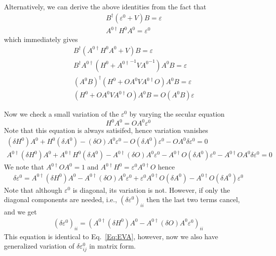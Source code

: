 \documentclass[aps,prb,floatfix,epsfig,singlecolumn,showpacs,preprintnumbers]{revtex4}
\newcommand{\vk}{{\mathbf{k}}}
\newcommand{\vK}{{\mathbf{K}}}
\begin{document}
Alternatively, we can derive the above identities from the fact that
\begin{eqnarray}
&& B^\dagger (\varepsilon^0 + V)B = \varepsilon \\
&& A^{0\dagger} H^0 A^0 =\varepsilon^0
\end{eqnarray}
which immediately gives
\begin{eqnarray}
&& B^\dagger (A^{0\dagger} H^0 A^0 +V)B=\varepsilon\\
&& B^\dagger A^{0\dagger}(H^0+{A^{0\dagger}}^{-1}V {A^0}^{-1})A^0B=\varepsilon\\
&& (A^{0}B)^{\dagger}(H^0+O A^0 V A^{0\dagger}O)A^0B=\varepsilon \\
&& (H^0+O A^0 V A^{0\dagger}O)A^0B=O(A^0 B)\varepsilon 
\end{eqnarray}
% 


Now we check a small variation of the $\varepsilon^0$ by varying the
secular equation 
$$H^0 A^0=O A^0\varepsilon^0$$
Note that this equation is always satisifed,
hence variation vanishes
\begin{eqnarray}
(\delta H^0) A^0 + H^0 (\delta A^0) - (\delta O) A^0 \varepsilon^0 - O  (\delta A^0)\varepsilon^0 - O A^0 \delta\varepsilon^0=0\\
A^{0\dagger}(\delta H^0) A^0 + A^{0\dagger} H^0 (\delta A^0) - A^{0\dagger} (\delta O) A^0 \varepsilon^0 - A^{0\dagger} O  (\delta A^0)\varepsilon^0 - A^{0\dagger} O A^0 \delta\varepsilon^0=0
\end{eqnarray}
We note that $A^{0\dagger} O A^0=1$ and $A^{0\dagger} H^0=\varepsilon^0A^{0\dagger}O$ hence
\begin{eqnarray}
\delta\varepsilon^0=A^{0\dagger}(\delta H^0) A^0 - A^{0\dagger} (\delta O) A^0 \varepsilon^0 +  \varepsilon^0A^{0\dagger}O (\delta A^0) - A^{0\dagger} O  (\delta A^0)\varepsilon^0 
\label{Eq:227}
\end{eqnarray}
Note that although $\varepsilon^0$ is diagonal, its variation is not. 
However, if only the diagonal components are needed, i.e.,
$(\delta\varepsilon^0)_{ii}$ then the last two terms cancel, and we get
\begin{eqnarray}
(\delta\varepsilon^0)_{ii}=(A^{0\dagger}(\delta H^0) A^0 - A^{0\dagger} (\delta O) A^0 \varepsilon^0)_{ii}
\label{Eq:228}
\end{eqnarray}
This equation is identical to Eq.~\ref{Eq:EVA}, however, now we also
have generalized variation of $\delta \varepsilon^0_{ij}$ in matrix form.
\end{document}
